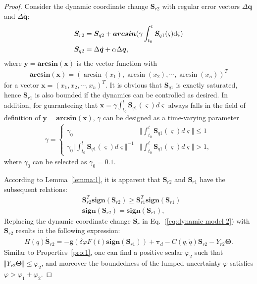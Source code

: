 \documentclass[3p]{elsarticle}
\theoremstyle{plain}
\theoremstyle{remark}
\begin{document}
\begin{proof}
Consider the dynamic coordinate change $\bm S_{r2}$ with regular error vectors $\Delta \bm q$ and $\Delta\dot{\bm q}$:
\begin{align}
\begin{split}
\bm S_{r2} &= \bm S_{q2}+\bm{arcsin}(\gamma\int^t_{t_0}\bm S_{q1}(\varsigma) \rm{d}\it{\varsigma})\\
\bm S_{q2} &= \Delta \dot {\bm q}+\alpha \Delta \bm q,\label{eq:sq2}
\end{split}
\end{align}
where $\bm y=\mathbf{arcsin}(\bm x)$ is the vector function with
\begin{align}
\mathbf{arcsin}(\bm x) = \left(\arcsin(x_1),\arcsin(x_2),\cdots,\arcsin(x_n)\right)^T
\end{align}
for a vector $\bm x=\left(x_1,x_2,\cdots,x_n\right)^T$. It is obvious that $\bm S_{q1}$ is exactly saturated, hence $\bm S_{r1}$ is also bounded if the dynamics can be controlled as desired. In addition, for guaranteeing that $\bm x=\gamma\int^t_{t_0}\bm S_{q1}(\varsigma) d\varsigma$ always falls in the field of definition of $\bm y=\mathbf{arcsin}(\bm x)$, $\gamma$ can be designed as a time-varying parameter
    \begin{align}
    \gamma=\begin{cases}
    \gamma_0&\Vert\int^t_{t_0}\bm S_{q1}(\varsigma) d\varsigma\Vert\le 1\\
    \gamma_0\Vert\int^t_{t_0}\bm S_{q1}(\varsigma) d\varsigma\Vert^{-1}&\Vert\int^t_{t_0}\bm S_{q1}(\varsigma) d\varsigma\Vert> 1,
  \end{cases}\label{eq:gamma}
    \end{align}
    where $\gamma_0$ can be selected as $\gamma_0=0.1$.

According to Lemma~\ref{lemma:1}, it is apparent that $\bm S_{r2}$ and $\bm S_{r1}$ have the subsequent relations:
\begin{align}
&\bm S_{r2}^T \mathbf{sign}(\bm S_{r2}) \ge  \bm S_{r1}^T \mathbf{sign}(\bm S_{r1})\\
&\mathbf{sign}(\bm S_{r2})=\mathbf{sign}(\bm S_{r1}),
\end{align}
Replacing the dynamic coordinate change $\bm S_r$ in Eq.~(\ref{eq:dynamic model 2}) with $\bm S_{r2}$ results in the following expression:
\begin{align}
H(q)\dot {\bm S}_{r2} = -\bm{g}(\delta\varphi F(t) \mathbf{sign}(\bm S_{r1}))+\bm\tau_d-C(q,\dot q)\bm S_{r2}-Y_{r2}\bm\Theta.
\end{align}
Similar to Properties~\ref{pro:1}, one can find a positive scalar $\varphi_2$ such that $\Vert Y_{r2}\bm\Theta\Vert\le\varphi_2$, and moreover the boundedness of the lumped uncertainty $\varphi$ satisfies $\varphi>\varphi_1+\varphi_2$.


\end{proof}
\end{document}
